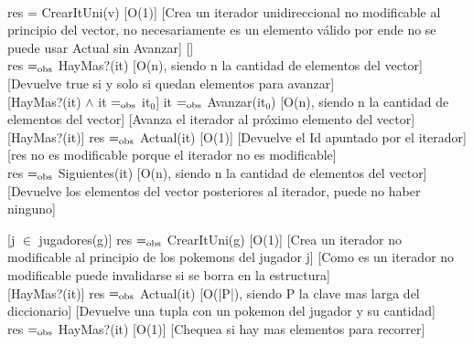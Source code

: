 

\\

{res = CrearItUni(v)}
[O(1)]
[Crea un iterador unidireccional no modificable al principio del vector, no necesariamente es un elemento válido por ende no se puede usar Actual sin Avanzar]
[]\\

{res $=_{\mathrm{obs}}$ HayMas?(it)}
[O(n), siendo n la cantidad de elementos del vector]
[Devuelve true si y solo si quedan elementos para avanzar]\\

[HayMas?(it) $\wedge$ it $=_{\mathrm{obs}}$ it$_0$]
{it $=_{\mathrm{obs}}$ Avanzar(it$_0$)}
[O(n), siendo n la cantidad de elementos del vector]
[Avanza el iterador al próximo elemento del vector]\\

[HayMas?(it)]
{res $=_{\mathrm{obs}}$ Actual(it)}
[O(1)]
[Devuelve el Id apuntado por el iterador]
[res no es modificable porque el iterador no es modificable]\\

{res $=_{\mathrm{obs}}$ Siguientes(it)}
[O(n), siendo n la cantidad de elementos del vector]
[Devuelve los elementos del vector posteriores al iterador, puede no haber ninguno]\\


[j $\in$ jugadores(g)]
{res $=_{\mathrm{obs}}$ CrearItUni(g)}
[O(1)]
[Crea un iterador no modificable al principio de los pokemons del jugador j]
[Como es un iterador no modificable puede invalidarse si se borra en la estructura]\\

[HayMas?(it)]
{res $=_{\mathrm{obs}}$ Actual(it)}
[O(|P|), siendo P la clave mas larga del diccionario]
[Devuelve una tupla con un pokemon del jugador y su cantidad]\\

{res $=_{\mathrm{obs}}$ HayMas?(it)}
[O(1)]
[Chequea si hay mas elementos para recorrer]\\

